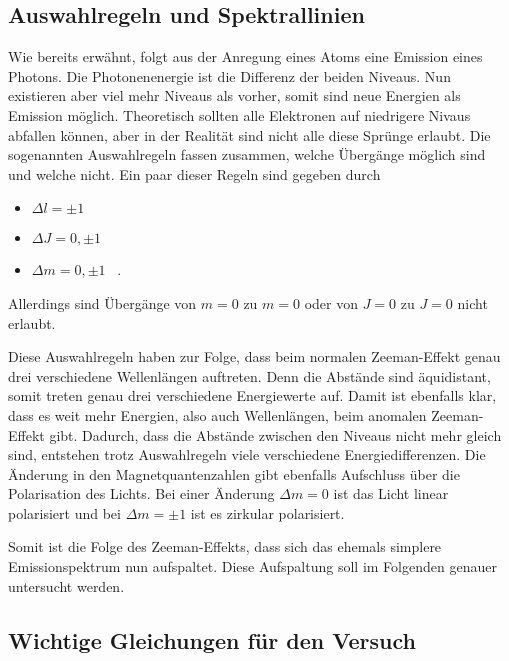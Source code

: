 \subsection{Auswahlregeln und Spektrallinien}
\label{ssec:theo5}

Wie bereits erwähnt, folgt aus der Anregung eines Atoms eine Emission eines Photons.
Die Photonenenergie ist die Differenz der beiden Niveaus.
Nun existieren aber viel mehr Niveaus als vorher, somit sind neue Energien als Emission möglich. 
Theoretisch sollten alle Elektronen auf niedrigere Nivaus abfallen können, aber in der Realität sind nicht alle diese Sprünge erlaubt.
Die sogenannten Auswahlregeln fassen zusammen, welche Übergänge möglich sind und welche nicht.
Ein paar dieser Regeln sind gegeben durch
\begin{itemize} 
    \item $\Delta l = \pm 1$
    \item $\Delta J = 0, \pm 1$
    \item $\Delta m = 0, \pm 1$ \, .
\end{itemize}
Allerdings sind Übergänge von $m = 0$ zu $m = 0$ oder von $J = 0$ zu $J = 0$ nicht erlaubt.

Diese Auswahlregeln haben zur Folge, dass beim normalen Zeeman-Effekt genau drei verschiedene Wellenlängen auftreten. 
Denn die Abstände sind äquidistant, somit treten genau drei verschiedene Energiewerte auf.
Damit ist ebenfalls klar, dass es weit mehr Energien, also auch Wellenlängen, beim anomalen Zeeman-Effekt gibt.
Dadurch, dass die Abstände zwischen den Niveaus nicht mehr gleich sind, entstehen trotz Auswahlregeln viele verschiedene Energiedifferenzen.
Die Änderung in den Magnetquantenzahlen gibt ebenfalls Aufschluss über die Polarisation des Lichts. 
Bei einer Änderung $\Delta m = 0$ ist das Licht linear polarisiert und bei $\Delta m = \pm 1$ ist es zirkular polarisiert.

Somit ist die Folge des Zeeman-Effekts, dass sich das ehemals simplere Emissionspektrum nun aufspaltet.
Diese Aufspaltung soll im Folgenden genauer untersucht werden. 

\subsection{Wichtige Gleichungen für den Versuch}
\label{ssec:theo6}

